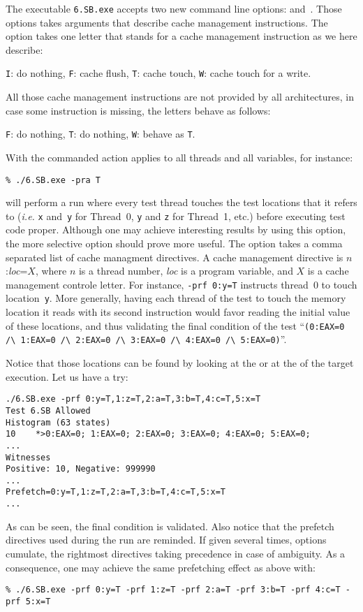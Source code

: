 The executable \texttt{6.SB.exe} accepts two new command line options:
 and~. Those options takes arguments that describe
cache management instructions.
The option  takes one letter that stands for a cache
management instruction as we here describe:
\begin{center}
\texttt{I}: do nothing,
\texttt{F}: cache flush,
\texttt{T}: cache touch,
\texttt{W}: cache touch for a write.
\end{center}
All those cache management instructions are not provided by all architectures,
in case some instruction is missing, the letters behave as follows:
\begin{center}
\texttt{F}: do nothing,
\texttt{T}: do nothing,
\texttt{W}: behave as \texttt{T}.
\end{center}

With  the commanded action applies to all
threads and all variables, for instance:
\begin{verbatim}
% ./6.SB.exe -pra T
\end{verbatim}
will perform a run where every test thread touches the test locations
that it refers to
(\emph{i.e.} \texttt{x} and~\texttt{y} for Thread~0, \texttt{y}
and \texttt{z} for Thread~1, etc.)
before executing test code proper.
Although one may achieve interesting results by using
this  option, the more selective
 option should prove more useful.
The  option takes a comma separated list of cache managment
directives.
A cache management directive is $n$:\textit{loc}=$X$,
where $n$ is a thread number, \textit{loc} is a program variable,
and $X$ is a cache management controle letter.
For instance, \texttt{-prf 0:y=T} instructs
thread~0 to touch location~\texttt{y}.
More generally, having each thread of the test
 to touch the memory location
it reads with its second instruction would favor reading the initial value
of these locations,
and thus validating
the final condition of the test 
``\verb+(0:EAX=0 /\ 1:EAX=0 /\ 2:EAX=0 /\ 3:EAX=0 /\ 4:EAX=0 /\ 5:EAX=0)+''.

Notice that those locations can be found by looking
at the 
or at the  of the target execution.
Let us have a try:
\begin{verbatim}
./6.SB.exe -prf 0:y=T,1:z=T,2:a=T,3:b=T,4:c=T,5:x=T               
Test 6.SB Allowed
Histogram (63 states)
10    *>0:EAX=0; 1:EAX=0; 2:EAX=0; 3:EAX=0; 4:EAX=0; 5:EAX=0;
...
Witnesses
Positive: 10, Negative: 999990
...
Prefetch=0:y=T,1:z=T,2:a=T,3:b=T,4:c=T,5:x=T
...
\end{verbatim}
As can be seen, the final condition is validated. Also notice
that the prefetch directives used during the run are reminded.
If given several times,  options cumulate,
the rightmost directives taking precedence in case of ambiguity.
As a consequence, one may achieve the same prefetching
effect as above with:
\begin{verbatim}
% ./6.SB.exe -prf 0:y=T -prf 1:z=T -prf 2:a=T -prf 3:b=T -prf 4:c=T -prf 5:x=T
\end{verbatim}


